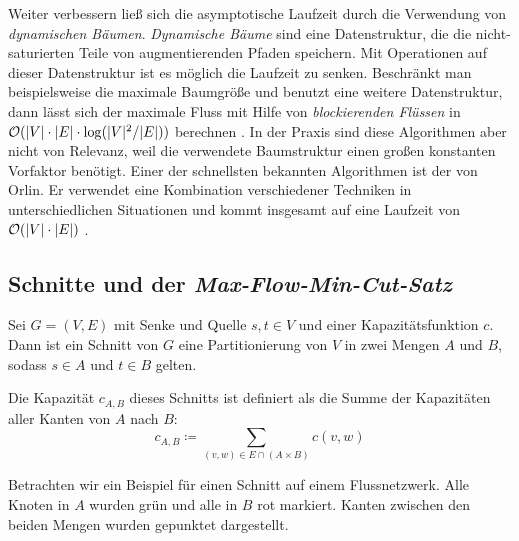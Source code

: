 Weiter verbessern ließ sich die asymptotische Laufzeit durch die Verwendung von \emph{dynamischen Bäumen}. \emph{Dynamische Bäume} sind eine Datenstruktur, die die nicht-saturierten Teile von augmentierenden Pfaden speichern. Mit Operationen auf dieser Datenstruktur ist es möglich die Laufzeit zu senken. Beschränkt man beispielsweise die maximale Baumgröße und benutzt eine weitere Datenstruktur, dann lässt sich der maximale Fluss mit Hilfe von \emph{blockierenden Flüssen} in $\mathcal{O}(|V|\cdot |E|\cdot \log(|V|^2/|E|))$ berechnen \cite{gt14}. In der Praxis sind diese Algorithmen aber nicht von Relevanz, weil die verwendete Baumstruktur einen großen konstanten Vorfaktor benötigt. Einer der schnellsten bekannten Algorithmen ist der von Orlin. Er verwendet eine Kombination verschiedener Techniken in unterschiedlichen Situationen und kommt insgesamt auf eine Laufzeit von $\mathcal{O}(|V|\cdot |E|)$ \cite{gt14}.
 
\subsection{Schnitte und der \emph{Max-Flow-Min-Cut-Satz}}

\begin{definition}[Schnitt]
	Sei $G = (V,E)$ mit Senke und Quelle $s, t \in V$ und einer Kapazitätsfunktion $c$. Dann ist ein Schnitt von $G$ eine Partitionierung von $V$ in zwei Mengen $A$ und $B$, sodass $s \in A$ und $t \in B$ gelten.
	
	Die Kapazität $c_{A,B}$ dieses Schnitts ist definiert als die Summe der Kapazitäten aller Kanten von $A$ nach $B$:
	\begin{equation}
		c_{A,B} \coloneqq \sum_{(v,w) \in E \cap (A \times B)}{c(v,w)}
	\end{equation}
\end{definition}

Betrachten wir ein Beispiel für einen Schnitt auf einem Flussnetzwerk. Alle Knoten in $A$ wurden grün und alle in $B$ rot markiert. Kanten zwischen den beiden Mengen wurden gepunktet dargestellt.

